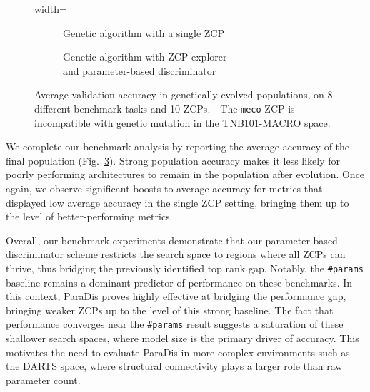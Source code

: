\documentclass[10pt]{article} %
\begin{document}
\begin{figure}[h]
\centering
\begin{adjustbox}{width=\linewidth}
    \begin{subfigure}[t]{.52\textwidth}
        \resizebox{\textwidth}{!}{}
        \caption{\centering Genetic algorithm with a single ZCP}
        \label{fig_genetic_avg_same}
    \end{subfigure}%
    \hfill%
    \begin{subfigure}[t]{.48\textwidth}
        \resizebox{\textwidth}{!}{}
        \caption{\centering Genetic algorithm with ZCP explorer \\
        and parameter-based discriminator}
        \label{fig_genetic_avg_regparams}
    \end{subfigure}%
\end{adjustbox}
\caption{Average validation accuracy in genetically evolved populations, on 8 different benchmark tasks and 10 ZCPs.~\dag~The \texttt{meco} ZCP is incompatible with genetic mutation in the TNB101-MACRO space.}
\label{fig_genetic_avg}
\end{figure}

We complete our benchmark analysis by reporting the average accuracy of the final population (Fig.~\ref{fig_genetic_avg}). Strong population accuracy makes it less likely for poorly performing architectures to remain in the population after evolution. Once again, we observe significant boosts to average accuracy for metrics that displayed low average accuracy in the single ZCP setting, bringing them up to the level of better-performing metrics.

Overall, our benchmark experiments demonstrate that our parameter-based discriminator scheme restricts the search space to regions where all ZCPs can thrive, thus bridging the previously identified top rank gap. Notably, the \texttt{\#params} baseline remains a dominant predictor of performance on these benchmarks. In this context, ParaDis proves highly effective at bridging the performance gap, bringing weaker ZCPs up to the level of this strong baseline. The fact that performance converges near the \texttt{\#params} result suggests a saturation of these shallower search spaces, where model size is the primary driver of accuracy. This motivates the need to evaluate ParaDis in more complex environments such as the DARTS space, where structural connectivity plays a larger role than raw parameter count.
\end{document}
